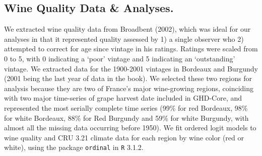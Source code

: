 \documentclass[final]{nature}
\begin{document}
\begin{methods}
\subsection{Wine Quality Data \& Analyses.}
\noindent We extracted wine quality data from Broadbent (2002)\cite{Broadbent2002}, which was ideal for our analyses in that it represented quality assessed by 1) a single observer who 2) attempted to correct for age since vintage in his ratings. Ratings were scaled from 0 to 5, with 0 indicating a `poor' vintage and 5 indicating an `outstanding' vintage. We extracted data for the 1900-2001 vintages in Bordeaux and Burgundy (2001 being the last year of data in the book). We selected these two regions for analysis because they are two of France's major wine-growing regions, coinciding with two major time-series of grape harvest date included in GHD-Core, and represented the most serially complete time series (99\% for red Bordeaux, 98\% for white Bordeaux, 88\% for Red Burgundy and 59\% for white Burgundy, with almost all the missing data occurring before 1950). We fit ordered logit models to wine quality and CRU 3.21 climate data for each region by wine color (red or white), using the package \verb|ordinal| in \verb|R| 3.1.2\cite{Rcore2014}.

\end{methods}





\end{document}
